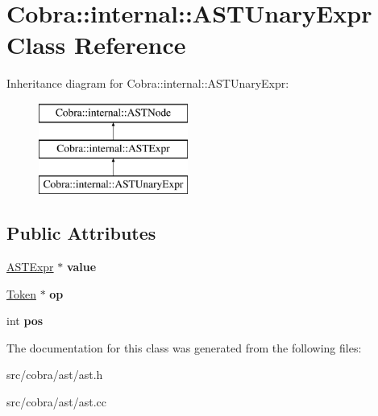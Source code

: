 \hypertarget{class_cobra_1_1internal_1_1_a_s_t_unary_expr}{\section{Cobra\+:\+:internal\+:\+:A\+S\+T\+Unary\+Expr Class Reference}
\label{class_cobra_1_1internal_1_1_a_s_t_unary_expr}
}
Inheritance diagram for Cobra\+:\+:internal\+:\+:A\+S\+T\+Unary\+Expr\+:\begin{figure}[H]
\begin{center}
\leavevmode
\includegraphics[height=3.000000cm]{class_cobra_1_1internal_1_1_a_s_t_unary_expr}
\end{center}
\end{figure}
\subsection*{Public Attributes}
\begin{DoxyCompactItemize}
\item 
\hypertarget{class_cobra_1_1internal_1_1_a_s_t_unary_expr_a42f025f4ad5154da2e8443c93b4503b6}{\hyperlink{class_cobra_1_1internal_1_1_a_s_t_expr}{A\+S\+T\+Expr} $\ast$ {\bfseries value}}\label{class_cobra_1_1internal_1_1_a_s_t_unary_expr_a42f025f4ad5154da2e8443c93b4503b6}

\item 
\hypertarget{class_cobra_1_1internal_1_1_a_s_t_unary_expr_aa284a1dd2bb9b1d09242957f322fa780}{\hyperlink{class_cobra_1_1internal_1_1_token}{Token} $\ast$ {\bfseries op}}\label{class_cobra_1_1internal_1_1_a_s_t_unary_expr_aa284a1dd2bb9b1d09242957f322fa780}

\item 
\hypertarget{class_cobra_1_1internal_1_1_a_s_t_unary_expr_aa7e66ada18fdc5b342f7b051261fde5c}{int {\bfseries pos}}\label{class_cobra_1_1internal_1_1_a_s_t_unary_expr_aa7e66ada18fdc5b342f7b051261fde5c}

\end{DoxyCompactItemize}


The documentation for this class was generated from the following files\+:\begin{DoxyCompactItemize}
\item 
src/cobra/ast/ast.\+h\item 
src/cobra/ast/ast.\+cc\end{DoxyCompactItemize}
